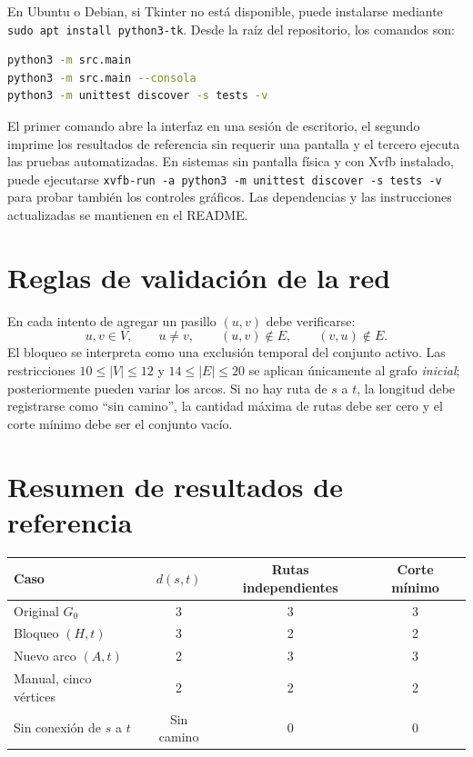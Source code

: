 \documentclass[11pt,a4paper]{article}
\begin{document}
En Ubuntu o Debian, si Tkinter no está disponible, puede instalarse mediante \texttt{sudo apt install python3-tk}. Desde la raíz del repositorio, los comandos son:
\begin{lstlisting}[language=bash]
python3 -m src.main
python3 -m src.main --consola
python3 -m unittest discover -s tests -v
\end{lstlisting}
El primer comando abre la interfaz en una sesión de escritorio, el segundo imprime los resultados de referencia sin requerir una pantalla y el tercero ejecuta las pruebas automatizadas. En sistemas sin pantalla física y con Xvfb instalado, puede ejecutarse \texttt{xvfb-run -a python3 -m unittest discover -s tests -v} para probar también los controles gráficos. Las dependencias y las instrucciones actualizadas se mantienen en el README.




\appendix
\section{Reglas de validación de la red}
En cada intento de agregar un pasillo $(u,v)$ debe verificarse:
\[u,v\in V,\qquad u\neq v,\qquad (u,v)\notin E,\qquad (v,u)\notin E.\]
El bloqueo se interpreta como una exclusión temporal del conjunto activo. Las restricciones $10\leq|V|\leq12$ y $14\leq|E|\leq20$ se aplican únicamente al grafo \emph{inicial}; posteriormente pueden variar los arcos. Si no hay ruta de $s$ a $t$, la longitud debe registrarse como \enquote{sin camino}, la cantidad máxima de rutas debe ser cero y el corte mínimo debe ser el conjunto vacío.

\section{Resumen de resultados de referencia}
\begin{center}
\begin{tabular}{lccc}
\toprule
Caso & $d(s,t)$ & Rutas independientes & Corte mínimo \\
\midrule
Original $G_0$ & 3 & 3 & 3\\
Bloqueo $(H,t)$ & 3 & 2 & 2\\
Nuevo arco $(A,t)$ & 2 & 3 & 3\\
Manual, cinco vértices & 2 & 2 & 2\\
Sin conexión de $s$ a $t$ & Sin camino & 0 & 0\\
\bottomrule
\end{tabular}
\end{center}
\end{document}
